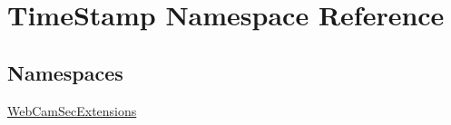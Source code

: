\hypertarget{namespace_time_stamp}{}\section{Time\+Stamp Namespace Reference}
\label{namespace_time_stamp}
\subsection*{Namespaces}
\begin{DoxyCompactItemize}
\item 
 \hyperlink{namespace_time_stamp_1_1_web_cam_sec_extensions}{Web\+Cam\+Sec\+Extensions}
\end{DoxyCompactItemize}
